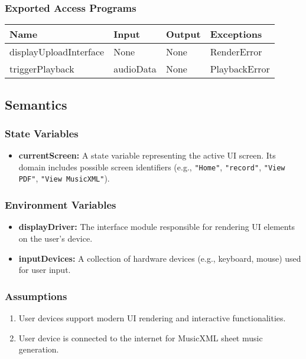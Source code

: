 \documentclass[12pt, titlepage]{article}
\begin{document}
\subsubsection{Exported Access Programs}  
\begin{center}  
\begin{tabular}{|p{5cm}|p{2cm}|p{4cm}|p{3.5cm}|}  
\hline  
\textbf{Name} & \textbf{Input} & \textbf{Output} & \textbf{Exceptions} \\  
\hline  
displayUploadInterface & None & None & RenderError \\  
triggerPlayback & audioData & None & PlaybackError \\  
\hline  
\end{tabular}  
\end{center}  

\subsection{Semantics}  
\subsubsection{State Variables}
\begin{itemize}
    \item \textbf{currentScreen:} A state variable representing the active UI screen. Its domain includes possible screen identifiers (e.g., \texttt{"Home"}, \texttt{"record"}, \texttt{"View PDF"}, \texttt{"View MusicXML"}).
\end{itemize}

\subsubsection{Environment Variables}
\begin{itemize}
    \item \textbf{displayDriver:} The interface module responsible for rendering UI elements on the user's device.
    \item \textbf{inputDevices:} A collection of hardware devices (e.g., keyboard, mouse) used for user input.
\end{itemize}

\subsubsection{Assumptions}
\begin{enumerate}
    \item User devices support modern UI rendering and interactive functionalities.
    \item User device is connected to the internet for MusicXML sheet music generation.
\end{enumerate}
\end{document}
